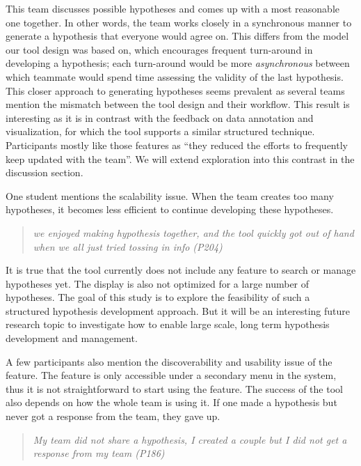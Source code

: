 This team discusses possible hypotheses and comes up with a most reasonable one together. In other words, the team works closely in a synchronous manner to generate a hypothesis that everyone would agree on. This differs from the model our tool design was based on, which encourages frequent turn-around in developing a hypothesis; each turn-around would be more \textit{asynchronous} between which teammate would spend time assessing the validity of the last hypothesis. This closer approach to generating hypotheses seems prevalent as several teams mention the mismatch between the tool design and their workflow. This result is interesting as it is in contrast with the feedback on data annotation and visualization, for which the tool supports a similar structured technique. Participants mostly like those features as ``they reduced the efforts to frequently keep updated with the team''. We will extend exploration into this contrast in the discussion section.



One student mentions the scalability issue. When the team creates too many hypotheses, it becomes less efficient to continue developing these hypotheses. 

\begin{quote}
	\emph{we enjoyed making hypothesis together, and the tool quickly got out of hand when we all just tried tossing in info (P204)}
\end{quote}

It is true that the tool currently does not include any feature to search or manage hypotheses yet. The display is also not optimized for a large number of hypotheses. The goal of this study is to explore the feasibility of such a structured hypothesis development approach. But it will be an interesting future research topic to investigate how to enable large scale, long term hypothesis development and management. 

A few participants also mention the discoverability and usability issue of the feature. The feature is only accessible under a secondary menu in the system, thus it is not straightforward to start using the feature. The success of the tool also depends on how the whole team is using it. If one made a hypothesis but never got a response from the team, they gave up.

\begin{quote}
\emph{My team did not share a hypothesis, I created a couple but I did not get a response from my team (P186)}
\end{quote}

